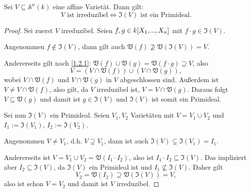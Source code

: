 \documentclass[a4paper,12pt,index=toc]{scrbook}
\theoremstyle{keinenummern} %
\def\A{\mathbb{A}}
\def\V{\mathfrak{V}}
\def\I{\mathfrak{I}}
\renewcommand{\dotsc}{\ensuremath{\!...}}
\newcommand{\polyx}[1][n]{\ensuremath%
  [X_{1},\dotsc,X_{#1}]}
\begin{document}
\begin{bem}\label{1.2.9}
Sei $V\subseteq\A^{n}(k)$ eine affine Varietät. Dann gilt:
\[V\text{ ist irreduzibel}\iff\I(V)\text{ ist ein Primideal}.\]
\end{bem}
\begin{proof}
Sei zuerst $V$ irreduzibel. Seien $f,g\in k\polyx$ mit $f\cdot g\in\I(V)$. 

Angenommen $f\notin\I(V)$, dann gilt auch $\V(f)\not\supseteq\V(\I(V))=V$.

Andererseits gilt nach \cref{1.2.1}: $\V(f)\cup\V(g)=\V(f\cdot g)\supseteq V$, also
\[V=(V\cap \V(f))\cup(V\cap\V(g)),\]
wobei $V\cap\V(f)$ und $V\cap\V(g)$ in $V$ abgeschlossen sind. Außerdem ist $V\neq V\cap\V(f)$, also gilt, da $V$ irreduzibel ist, $V=V\cap\V(g)$. Daraus folgt $V\subseteq\V(g)$ und damit ist $g\in\I(V)$ und $\I(V)$ ist somit ein Primideal.

Sei nun $\I(V)$ ein Primideal. Seien $V_{1},V_{2}$ Varietäten mit $V=V_{1}\cup V_{2}$ und $I_{1}:=\I(V_{1})$, $I_{2}:=\I(V_{2})$.

Angenommen $V\neq V_{1}$, d.h. $V\supsetneq V_{1}$, dann ist auch $\I(V)\subsetneq\I(V_{1})=I_{1}$.

Andererseits ist $V=V_{1}\cup V_{2}=\V(I_{1}\cdot I_{2})$, also ist $I_{1}\cdot I_{2}\subseteq\I(V)$. Das impliziert aber $I_{2}\subseteq\I(V)$, da $\I(V)$ ein Primideal ist und $I_{1}\not\subseteq\I(V)$. Daher gilt 
\[V_{2}=\V(I_{2})\supseteq\V(\I(V))=V,\] 
also ist schon $V=V_{2}$ und damit ist $V$ irreduzibel.
\end{proof}
\end{document}
